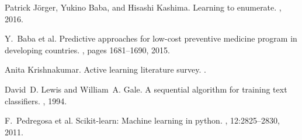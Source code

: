 \documentclass{deime}
\begin{document}
% 
% 

\begin{thebibliography}{1}

Patrick J\"{o}rger, Yukino Baba, and Hisashi Kashima.
\newblock Learning to enumerate.
, 2016.

Y.~Baba et al.
\newblock Predictive approaches for low-cost preventive medicine program in
  developing countries.
, pages 1681--1690, 2015.

Anita Krishnakumar.
\newblock Active learning literature survey.
.

David~D. Lewis and William~A. Gale.
\newblock A sequential algorithm for training text classifiers.
,
  1994.

F.~Pedregosa et al.
\newblock Scikit-learn: Machine learning in python.
, 12:2825--2830, 2011.

\end{thebibliography}
\end{document}

